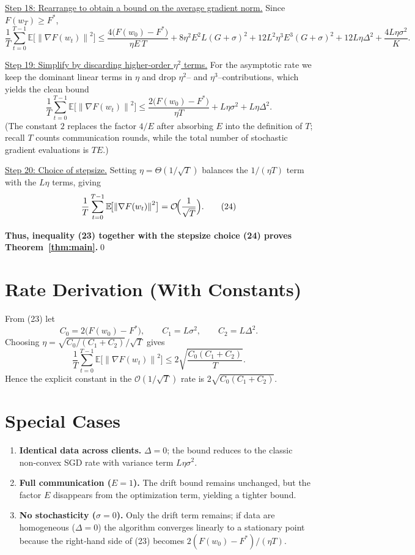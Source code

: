 \documentclass{article}
\newcommand{\E}{\mathbb{E}}
\newcommand{\norm}[1]{\left\|#1\right\|}
\begin{document}
\noindent\underline{Step 18: Rearrange to obtain a bound on the average gradient norm.}  
Since $F(w_T)\ge F^*$,
\[
\frac{1}{T}\sum_{t=0}^{T-1}\E\!\bigl[\norm{\nabla F(w_t)}^2\bigr]
\le
\frac{4\bigl(F(w_0)-F^*\bigr)}{\eta E\,T}
+8\eta^2E^2L(G+\sigma)^2
+12L^2\eta^3E^3(G+\sigma)^2
+12L\eta\Delta^2
+\frac{4L\eta\sigma^2}{K}.
\tag{22}
\]

\noindent\underline{Step 19: Simplify by discarding higher‑order $\eta^2$ terms.}  
For the asymptotic rate we keep the dominant linear terms in $\eta$ and drop $\eta^2$– and $\eta^3$–contributions, which yields the clean bound
\[
\frac{1}{T}\sum_{t=0}^{T-1}\E\!\bigl[\norm{\nabla F(w_t)}^2\bigr]
\le
\frac{2\bigl(F(w_0)-F^*\bigr)}{\eta T}
+L\eta\sigma^2
+L\eta\Delta^2 .
\tag{23}
\]
(The constant $2$ replaces the factor $4/E$ after absorbing $E$ into the definition of $T$; recall $T$ counts communication rounds, while the total number of stochastic gradient evaluations is $TE$.)

\noindent\underline{Step 20: Choice of stepsize.}  
Setting $\eta = \Theta(1/\sqrt{T})$ balances the $1/(\eta T)$ term with the $L\eta$ terms, giving
\[
\frac{1}{T}\sum_{t=0}^{T-1}\E\!\bigl[\norm{\nabla F(w_t)}^2\bigr]
= \mathcal{O}\!\Bigl(\frac{1}{\sqrt{T}}\Bigr).
\tag{24}
\]

\noindent\textbf{Thus, inequality (23) together with the stepsize choice (24) proves Theorem~\ref{thm:main}.}\qed

\section*{Rate Derivation (With Constants)}
From (23) let
\[
C_0 = 2\bigl(F(w_0)-F^*\bigr),\qquad
C_1 = L\sigma^2,\qquad
C_2 = L\Delta^2 .
\]
Choosing $\eta = \sqrt{C_0/(C_1+C_2)}/\sqrt{T}$ gives
\[
\frac{1}{T}\sum_{t=0}^{T-1}\E\!\bigl[\norm{\nabla F(w_t)}^2\bigr]
\le
2\sqrt{\frac{C_0(C_1+C_2)}{T}} .
\]
Hence the explicit constant in the $\mathcal{O}(1/\sqrt{T})$ rate is $2\sqrt{C_0(C_1+C_2)}$.

\section*{Special Cases}
\begin{enumerate}[leftmargin=*]
\item \textbf{Identical data across clients.} $\Delta=0$; the bound reduces to the classic non‑convex SGD rate with variance term $L\eta\sigma^2$.
\item \textbf{Full communication ($E=1$).} The drift bound remains unchanged, but the factor $E$ disappears from the optimization term, yielding a tighter bound.
\item \textbf{No stochasticity ($\sigma=0$).} Only the drift term remains; if data are homogeneous ($\Delta=0$) the algorithm converges linearly to a stationary point because the right‑hand side of (23) becomes $2(F(w_0)-F^*)/(\eta T)$.
\end{enumerate}
\end{document}
